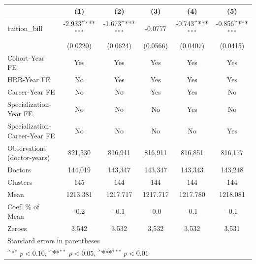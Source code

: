 {
\def\sym#1{\ifmmode^{#1}\else\(^{#1}\)\fi}
\begin{tabular}{l*{5}{c}}
\hline\hline
                    &\multicolumn{1}{c}{(1)}         &\multicolumn{1}{c}{(2)}         &\multicolumn{1}{c}{(3)}         &\multicolumn{1}{c}{(4)}         &\multicolumn{1}{c}{(5)}         \\
\hline
tuition\_bill        &      -2.933\sym{***}&      -1.673\sym{***}&     -0.0777         &      -0.743\sym{***}&      -0.856\sym{***}\\
                    &    (0.0220)         &    (0.0624)         &    (0.0566)         &    (0.0407)         &    (0.0415)         \\
[1em]
Cohort-Year FE      &         Yes         &         Yes         &         Yes         &         Yes         &         Yes         \\
[1em]
HRR-Year FE         &          No         &         Yes         &         Yes         &         Yes         &         Yes         \\
[1em]
Career-Year FE      &          No         &          No         &         Yes         &         Yes         &          No         \\
[1em]
Specialization-Year FE&          No         &          No         &          No         &         Yes         &          No         \\
[1em]
Specialization-Career-Year FE&          No         &          No         &          No         &          No         &         Yes         \\
\hline
Observations (doctor-years)&     821,530         &     816,911         &     816,911         &     816,851         &     816,177         \\
Doctors             &     144,019         &     143,347         &     143,347         &     143,343         &     143,248         \\
Clusters            &         145         &         144         &         144         &         144         &         144         \\
Mean                &    1213.381         &    1217.717         &    1217.717         &    1217.780         &    1218.081         \\
Coef. \% of Mean    &        -0.2         &        -0.1         &        -0.0         &        -0.1         &        -0.1         \\
Zeroes              &       3,542         &       3,532         &       3,532         &       3,532         &       3,531         \\
\hline\hline
\multicolumn{6}{l}{\footnotesize Standard errors in parentheses}\\
\multicolumn{6}{l}{\footnotesize \sym{*} \(p<0.10\), \sym{**} \(p<0.05\), \sym{***} \(p<0.01\)}\\
\end{tabular}
}
